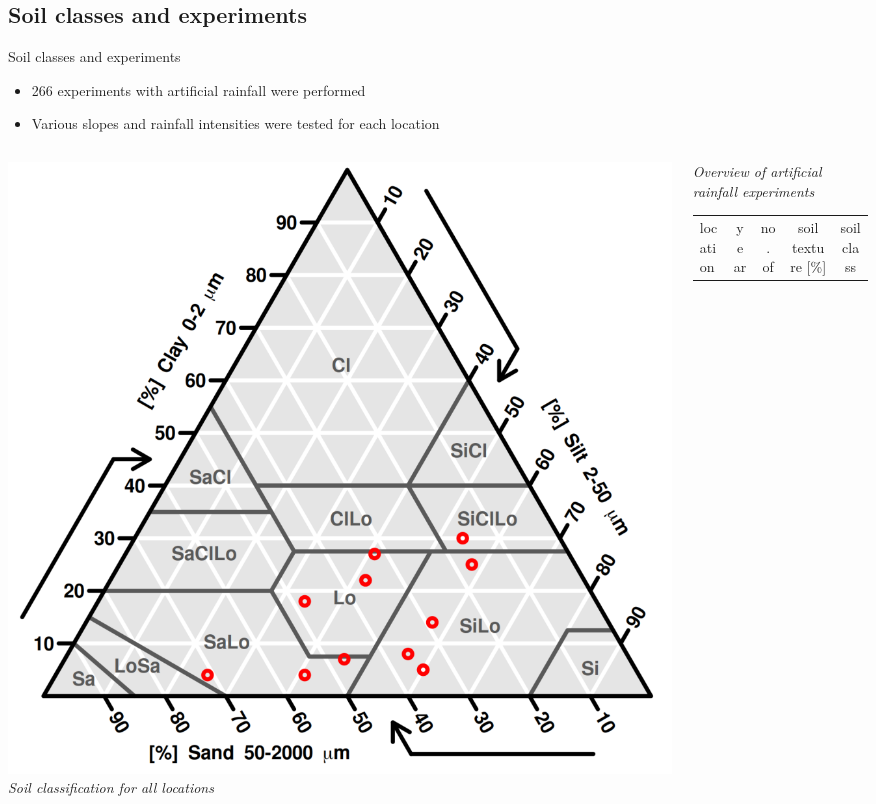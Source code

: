 \subsection{Soil classes and experiments}
\begin{block}{Soil classes and experiments}
    \begin{itemize}
        \item 266 experiments with artificial rainfall were performed 
        \item Various slopes and rainfall intensities were tested for each location
    \end{itemize}\vspace{-0.25cm}

    \begin{columns}
        \begin{column}{0.4\textwidth}
            \includegraphics[width=.95\textwidth]{obr/soil_triangle.png}
            {\it Soil classification for all locations}
        \end{column}
        \begin{column}{0.6\textwidth}
            {\it Overview of artificial rainfall experiments}
            {\small 
            \begin{table}[]
                \begin{tabular}{lcccccc}
                \hline
                \hline
                location      & year    & no. of            & \multicolumn{3}{c}{soil texture {[}\%{]}}  & soil class      \\

\end{tabular}
\end{table}}
\end{column}
\end{columns}
\end{block}
